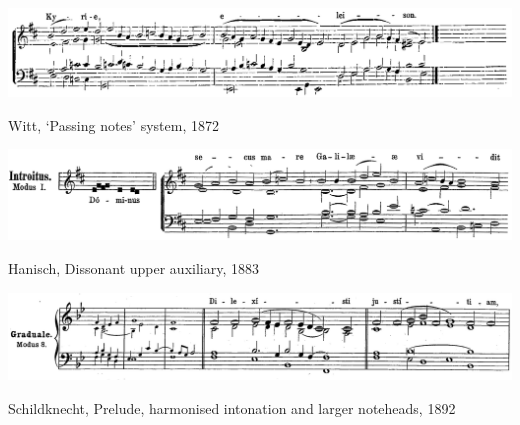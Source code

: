 \begin{landscape}

  \vspace*{\fill}

  \begin{example}
    \centering
    \includegraphics[width=.9\linewidth]{c/1/ex/witt_continuous_30.png}
    \caption{Witt, `Passing notes' system, 1872}
    \label{mus:witt_continuous_30}
  \end{example}

  \vspace*{\fill}

\end{landscape}

\begin{landscape}

  \vspace*{\fill}

  \begin{example}
    \centering
    \includegraphics[width=.8\linewidth]{c/1/ex/hanisch_auxiliary_1.png}
    \caption{Hanisch, Dissonant upper auxiliary, 1883}
    \label{mus:hanisch_upper_1}
  \end{example}

  \vspace*{\fill}

  \begin{example}
    \centering
    \includegraphics[width=.8\linewidth]{c/1/ex/schildknecht_supplement_[60].png}
    \caption{Schildknecht, Prelude, harmonised intonation and larger noteheads, 1892}
    \label{mus:schildknecht_supplement_[60]}
  \end{example}

  \vspace*{\fill}

\end{landscape}

